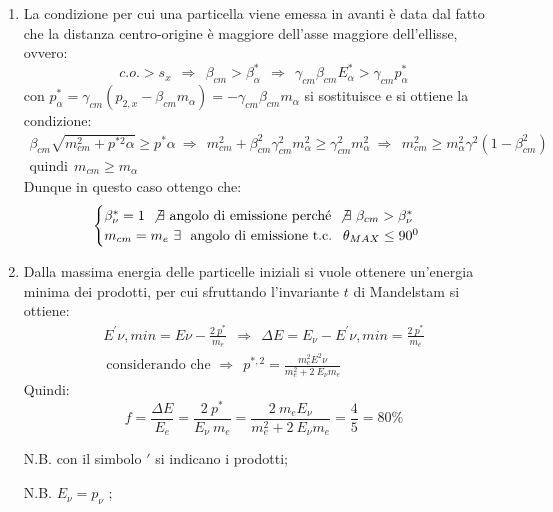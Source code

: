 \documentclass[12pt,twoside,a4]{article}
\begin{document}
\begin{solution}
\vspace{-1cm}
\begin{enumerate}[label=(\textit{\roman*})]
\item La condizione per cui una particella viene emessa in avanti è data dal fatto che la distanza centro-origine è maggiore dell'asse maggiore dell'ellisse, ovvero:
\begin{equation*}
c.o. > s_x \ \ \Rightarrow \ \ \beta_{cm} > \beta^\ast_\alpha \ \ \Rightarrow \ \ \gamma_{cm} \beta_{cm} E^\ast_\alpha > \gamma_{cm} p^\ast_\alpha 
\end{equation*}
con $p^\ast_\alpha = \gamma_{cm} (p_{2,x} - \beta_{cm} m_\alpha) = -\gamma_{cm} \beta_{cm} m_\alpha$ si sostituisce e si ottiene la condizione:
\begin{gather}
\beta_{cm} \sqrt{m^2_{cm} + p^{\ast 2}\alpha} \ge p^\ast\alpha \ \Rightarrow \ \ m^2_{cm} + \beta^2_{cm} \gamma^2_{cm} m^2_\alpha \ge \gamma^2_{cm} m^2_\alpha \ \Rightarrow \ \ m^2_{cm} \ge m^2_\alpha \gamma^2 (1-\beta^2_{cm})  \\ \text{quindi} \ \ m_{cm} \ge m_\alpha 
\end{gather}
Dunque in questo caso ottengo che:
\begin{equation*}
\begin{cases}
\beta^\ast_\nu =1 \  \not\exists \text{ angolo di emissione perché} \ \not\exists \ \beta_{cm} > \beta^\ast_\nu \\
m_{cm} = m_e \  \exists \ \text{ angolo di emissione t.c. } \ \theta_{MAX} \le 90^0
\end{cases} 
\end{equation*}
\item Dalla massima energia delle particelle iniziali si vuole ottenere un'energia minima dei prodotti, per cui sfruttando l'invariante $t$ di Mandelstam si ottiene:
\begin{gather}
E^{'}{ \nu, min} = E\nu - \frac{2 \ p^\ast}{m_e} \ \ \Rightarrow \ \ \Delta E = E_\nu - E^{'}{ \nu, min} = \frac{2 \ p^\ast}{m_e} \\ \  \text{considerando che } \Rightarrow \ \ p^{\ast,2} = \frac{m^2_e E^2\nu}{m^2_e + 2 \ E_\nu m_e} 
\end{gather}
Quindi:
\begin{equation*}
f = \frac{\Delta E}{E_e} = \frac{2 \ p^\ast}{E_\nu \ m_e} = \frac{2 \ m_e E_\nu}{m^2_e+2 \ E_\nu m_e} = \frac{4}{5} = 80 \%
\end{equation*}
 
 \bigskip
 N.B. con il simbolo $'$ si indicano i prodotti;
 
 N.B. $E_\nu = p_\nu$ ; 
 \end{enumerate}
\end{solution}
\end{document}
